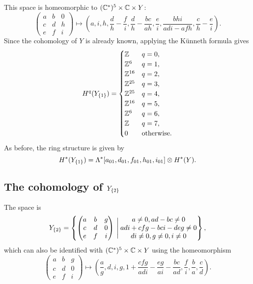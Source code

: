 This space is homeomorphic to $(\mathbb{C}^*)^5 \times \mathbb{C}\times Y$:
\[ \begin{pmatrix}
  a & b & 0 \\
  c & d & h \\
  e & f & i
\end{pmatrix} \mapsto \left(
a, i, h, \frac{d}{h}-\frac{f}{i}, \frac{d}{h}-\frac{bc}{ah},
\frac{e}{i}, \frac{bhi}{adi-afh},\frac{c}{h}-\frac{e}{i}
\right). \] 
Since the cohomology of $Y$ is already known, applying the K\"unneth
formula gives
\[ H^q(Y_{\left\{ 1 \right\}}) =
\begin{cases}
  \mathbb{Z} & q = 0, \\
  \mathbb{Z}^6 & q = 1, \\
  \mathbb{Z}^{16} & q = 2, \\
  \mathbb{Z}^{25} & q = 3, \\
  \mathbb{Z}^{25} & q = 4, \\
  \mathbb{Z}^{16} & q = 5, \\
  \mathbb{Z}^6 & q = 6, \\
  \mathbb{Z} & q = 7, \\
  0 & \text{otherwise}.
\end{cases} \] 
As before, the ring structure is given by
\[ H^*(Y_{\left\{ 1 \right\}}) =
\Lambda^*[a_{01},d_{01},f_{01},h_{01},i_{01}] \otimes H^*(Y).\]

\subsection{The cohomology of $Y_{\left\{ 2 \right\}}$}

The space is
\[ Y_{\left\{ 2 \right\}} = \left\{ 
  \begin{pmatrix}
    a & b & g \\
    c & d & 0 \\
    e & f & i
  \end{pmatrix} \:\Bigg\vert\:
  \begin{matrix}
    a \neq 0, ad-bc \neq 0 \\
    adi +cfg -bci - deg \neq 0 \\
    di \neq 0, g\neq 0, i \neq 0 \end{matrix}
 \right\}, \]
which can also be identified with $(\mathbb{C}^*)^5\times \mathbb{C}\times Y$ using
the homeomorphism
\[ \begin{pmatrix}
  a & b & g \\
  c & d & 0 \\
  e & f & i
\end{pmatrix} \mapsto \left(\frac{a}{g},d,i,g, 1+\frac{cfg}{adi}-
  \frac{eg}{ai}-\frac{bc}{ad}, \frac{f}{i},\frac{b}{a}, \frac{c}{d}
\right).\]

